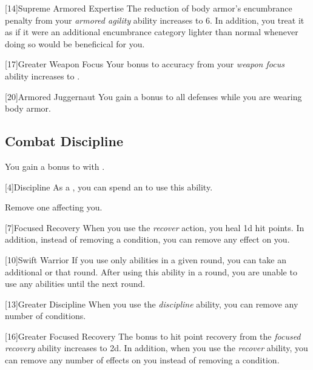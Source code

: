         [14]{Supreme Armored Expertise}
        The reduction of body armor's encumbrance penalty from your \textit{armored agility} ability increases to 6.
        In addition, you treat it as if it were an additional encumbrance category lighter than normal whenever doing so would be beneficical for you.

        [17]{Greater Weapon Focus} 
        Your bonus to accuracy from your \textit{weapon focus} ability increases to .

        [20]{Armored Juggernaut}
        You gain a  bonus to all defenses while you are wearing body armor.

    \subsection{Combat Discipline}

        You gain a  bonus to  with .

        [4]{Discipline} As a , you can spend an  to use this ability.
        \begin{ability}
            \begin{spelleffects}
                \spelleffect Remove one  affecting you.
            \end{spelleffects}
        \end{ability}

        [7]{Focused Recovery}
        When you use the \textit{recover} action, you heal \plus1d hit points.
        In addition, instead of removing a condition, you can remove any  effect on you.

        [10]{Swift Warrior}
        If you use only  abilities in a given round, you can take an additional  or  that round.
        After using this ability in a round, you are unable to use any  abilities until the next round.

        [13]{Greater Discipline}
        When you use the \textit{discipline} ability, you can remove any number of conditions.

        [16]{Greater Focused Recovery}
        The bonus to hit point recovery from the \textit{focused recovery} ability increases to \plus2d.
        In addition, when you use the \textit{recover} ability, you can remove any number of  effects on you instead of removing a condition.

